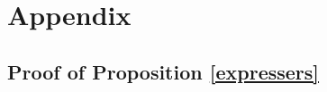 \documentclass{article}
\begin{document}
\newpage
\clearpage










\section{Appendix}

\subsection{Proof of Proposition \ref{expressers}} \label{prooflrexpressers}
\end{document}
